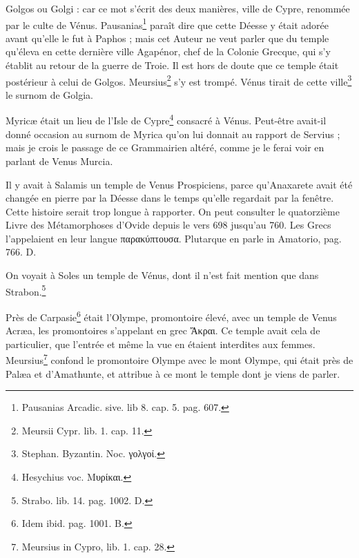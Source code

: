 \documentclass[a4paper, 11pt, oneside, polutonikogreek, french]{article}
\begin{document}
Golgos ou Golgi : car ce mot s'écrit des deux manières, ville de Cypre, renommée par le culte de Vénus. Pausanias\footnote{Pausanias Arcadic. sive. lib 8. cap. 5. pag. 607.} paraît dire que cette Déesse y était adorée avant qu'elle le fut à Paphos ; mais cet Auteur ne veut parler que du temple qu'éleva en cette dernière ville Agapénor, chef de la Colonie Grecque, qui s'y établit au retour de la guerre de Troie. Il est hors de doute que ce temple était postérieur à celui de Golgos. Meursius\footnote{Meursii Cypr. lib. 1. cap. 11.} s'y est trompé. Vénus tirait de cette ville\footnote{Stephan. Byzantin. Noc. γολγοί.} le surnom de Golgia.

Myricæ était un lieu de l'Isle de Cypre\footnote{Hesychius voc. Μυρίκαι.} consacré à Vénus. Peut-être avait-il donné occasion au surnom de Myrica qu'on lui donnait au rapport de Servius ; mais je crois le passage de ce Grammairien altéré, comme je le ferai voir en parlant de Venus Murcia.

Il y avait à Salamis un temple de Venus Prospiciens, parce qu'Anaxarete avait été changée en pierre par la Déesse dans le temps qu'elle regardait par la fenêtre. Cette histoire serait trop longue à rapporter. On peut consulter le quatorzième Livre des Métamorphoses d'Ovide depuis le vers 698 jusqu'au 760. Les Grecs l'appelaient en leur langue παρακύπτουσα. Plutarque en parle in Amatorio, pag. 766. D.

On voyait à Soles un temple de Vénus, dont il n'est fait mention que dans Strabon.\footnote{Strabo. lib. 14. pag. 1002. D.}

Près de Carpasie\footnote{Idem ibid. pag. 1001. B.} était l'Olympe, promontoire élevé, avec un temple de Venus Acræa, les promontoires s'appelant en grec Ἄκραι. Ce temple avait cela de particulier, que l'entrée et même la vue en étaient interdites aux femmes. Meursius\footnote{Meursius in Cypro, lib. 1. cap. 28.} confond le promontoire Olympe avec le mont Olympe, qui était près de Palæa et d'Amathunte, et attribue à ce mont le temple dont je viens de parler.
\end{document}
